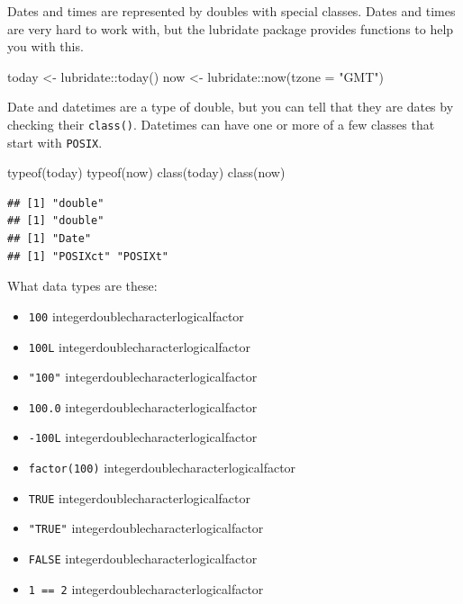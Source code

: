 \documentclass[
  oneside]{book}
\newenvironment{Shaded}{\begin{snugshade}}{\end{snugshade}}
\newcommand{\AttributeTok}[1]{\textcolor[rgb]{0.77,0.63,0.00}{#1}}
\newcommand{\FunctionTok}[1]{\textcolor[rgb]{0.00,0.00,0.00}{#1}}
\newcommand{\NormalTok}[1]{#1}
\newcommand{\OtherTok}[1]{\textcolor[rgb]{0.56,0.35,0.01}{#1}}
\newcommand{\SpecialCharTok}[1]{\textcolor[rgb]{0.00,0.00,0.00}{#1}}
\newcommand{\StringTok}[1]{\textcolor[rgb]{0.31,0.60,0.02}{#1}}
\providecommand{\tightlist}{%
  \setlength{\itemsep}{0pt}\setlength{\parskip}{0pt}}
\begin{document}
Dates and times are represented by doubles with special classes. Dates and times are very hard to work with, but the lubridate package provides functions to help you with this.

\begin{Shaded}
\begin{Highlighting}[]
\NormalTok{today }\OtherTok{\textless{}{-}}\NormalTok{ lubridate}\SpecialCharTok{::}\FunctionTok{today}\NormalTok{()}
\NormalTok{now }\OtherTok{\textless{}{-}}\NormalTok{ lubridate}\SpecialCharTok{::}\FunctionTok{now}\NormalTok{(}\AttributeTok{tzone =} \StringTok{"GMT"}\NormalTok{)}
\end{Highlighting}
\end{Shaded}

Date and datetimes are a type of double, but you can tell that they are dates by checking their \texttt{class()}. Datetimes can have one or more of a few classes that start with \texttt{POSIX}.

\begin{Shaded}
\begin{Highlighting}[]
\FunctionTok{typeof}\NormalTok{(today)}
\FunctionTok{typeof}\NormalTok{(now)}
\FunctionTok{class}\NormalTok{(today)}
\FunctionTok{class}\NormalTok{(now)}
\end{Highlighting}
\end{Shaded}

\begin{verbatim}
## [1] "double"
## [1] "double"
## [1] "Date"
## [1] "POSIXct" "POSIXt"
\end{verbatim}

\begin{try}

What data types are these:

\begin{itemize}
\tightlist
\item
  \texttt{100} integerdoublecharacterlogicalfactor
\item
  \texttt{100L} integerdoublecharacterlogicalfactor
\item
  \texttt{"100"} integerdoublecharacterlogicalfactor
\item
  \texttt{100.0} integerdoublecharacterlogicalfactor
\item
  \texttt{-100L} integerdoublecharacterlogicalfactor
\item
  \texttt{factor(100)} integerdoublecharacterlogicalfactor
\item
  \texttt{TRUE} integerdoublecharacterlogicalfactor
\item
  \texttt{"TRUE"} integerdoublecharacterlogicalfactor
\item
  \texttt{FALSE} integerdoublecharacterlogicalfactor
\item
  \texttt{1\ ==\ 2} integerdoublecharacterlogicalfactor
\end{itemize}

\end{try}
\end{document}
